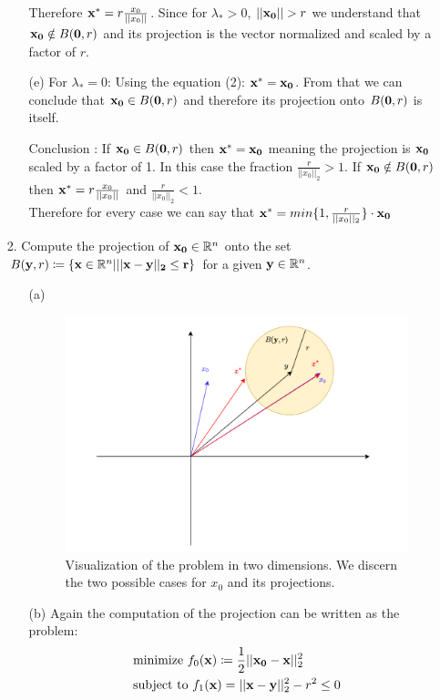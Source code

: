 \documentclass[12pt]{article}
\begin{document}
\begin{enumerate}
\begin{enumerate}
			Therefore ${\bf x^*}=r\frac{x_0}{||x_0||}$. Since for $\lambda_*>0$, $||{\bf x_0}|| > r$ we understand that ${\bf x_0}\notin B({\bf 0},r)$ and its projection is the vector normalized and scaled by a factor of $r$.\\
			
			\item[(e)]
			For $\lambda_*=0$: Using the equation (2): ${\bf x^*}={\bf x_0}$. From that we can conclude that ${\bf x_0}\in B({\bf 0},r)$ and therefore its projection onto $B({\bf 0},r)$ is itself.
			
			\item[Conclusion]:
			If ${\bf x_0}\in B({\bf 0},r)$ then ${\bf x^*}={\bf x_0}$ meaning the projection is ${\bf x_0}$ scaled by a factor of 1. In this case the fraction $\frac{r}{||x_0||_2}>1$. If ${\bf x_0}\notin B({\bf 0},r)$ then ${\bf x^*}=r\frac{x_0}{||x_0||}$ and $\frac{r}{||x_0||_2}<1$.\\
			Therefore for every case we can say that ${\bf x^*}=min\{1,\frac{r}{||x_0||_2}\}\cdot{\bf x_0}$
		\end{enumerate}
			
		\newpage
		\item[2.]
		Compute the projection of ${\bf x_0}\in \mathbb{R}^n$ onto the set $B({\bf y}, r) \coloneqq\{{\bf x}\in\mathbb{R}^n | ||{\bf x}-{}\bf y||_2\leq r\} $ for a given ${\bf y}\in\mathbb{R}^n$.
		
		\begin{enumerate}
			\item[(a)]
			\begin{figure}[h!]
				\begin{center}
					\includegraphics[width=1\linewidth]{2a}
				\end{center}
				\caption{Visualization of the problem in two dimensions. We discern the two possible cases for $x_0$ and its projections.}
			\end{figure}
			\item[(b)]
			Again the computation of the projection can be written as the problem:
			\begin{align*}
				&\text{minimize }f_0({\bf x})\coloneqq \frac{1}{2}||{\bf x_0}-{\bf x}||_2^2\\
				&\text{subject to }f_1({\bf x})=||{\bf x}-{\bf y}||_2^2-r^2\leq 0 
			\end{align*}
		

\end{enumerate}
\end{enumerate}
\end{document}
